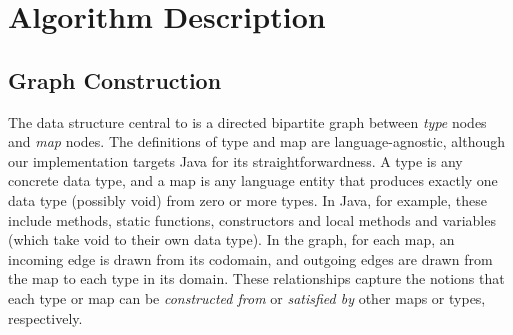 \section{Algorithm Description}
\subsection{Graph Construction}

The data structure central to \ourTool is a directed bipartite graph between \textit{type} nodes and \textit{map} nodes. The definitions of type and map are language-agnostic, although our implementation targets Java for its straightforwardness. A type is any concrete data type, and a map is any language entity that produces exactly one data type (possibly void) from zero or more types. In Java, for example, these include methods, static functions, constructors and local methods and variables (which take void to their own data type). In the graph, for each map, an incoming edge is drawn from its codomain, and outgoing edges are drawn from the map to each type in its domain. These relationships capture the notions that each type or map can be \textit{constructed from} or \textit{satisfied by} other maps or types, respectively.